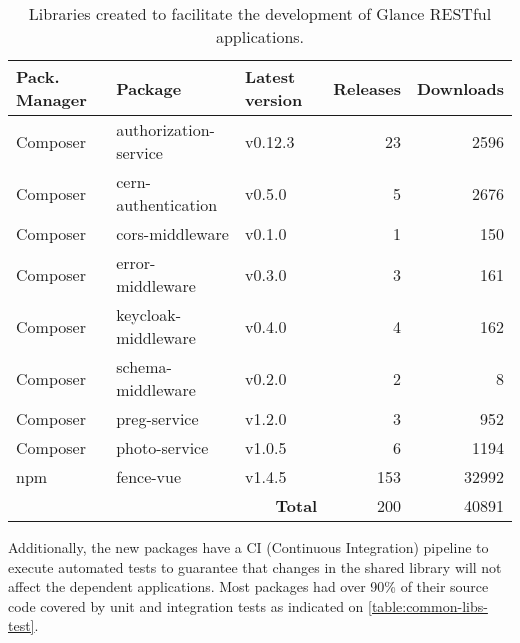 \begin{table}[htbp]
\begin{tabular}{ll|l|r|r|}
\hline
\multicolumn{1}{|l|}{Pack. Manager} & Package & Latest version & \multicolumn{1}{l|}{Releases} & \multicolumn{1}{l|}{Downloads} \\ \hline
\multicolumn{1}{|l|}{Composer} & authorization-service & v0.12.3 & 23  & 2596  \\ 
\multicolumn{1}{|l|}{Composer} & cern-authentication   & v0.5.0  & 5   & 2676  \\ 
\multicolumn{1}{|l|}{Composer} & cors-middleware       & v0.1.0  & 1   & 150   \\ 
\multicolumn{1}{|l|}{Composer} & error-middleware      & v0.3.0  & 3   & 161   \\ 
\multicolumn{1}{|l|}{Composer} & keycloak-middleware   & v0.4.0  & 4   & 162   \\ 
\multicolumn{1}{|l|}{Composer} & schema-middleware     & v0.2.0  & 2   & 8     \\ 
\multicolumn{1}{|l|}{Composer} & preg-service          & v1.2.0  & 3   & 952   \\ 
\multicolumn{1}{|l|}{Composer} & photo-service         & v1.0.5  & 6   & 1194  \\ 
\multicolumn{1}{|l|}{npm}      & fence-vue             & v1.4.5  & 153 & 32992 \\
\hline
         & & \multicolumn{1}{r|}{\textbf{Total}} & 200 & 40891 \\
\cline{3-5} 
\end{tabular}
\caption{Libraries created to facilitate the development of Glance RESTful applications.}
\label{table:common-libs}
\end{table}

Additionally, the new packages have a CI (Continuous Integration) pipeline to execute automated tests to guarantee that changes in the shared library will not affect the dependent applications. Most packages had over 90\% of their source code covered by unit and integration tests as indicated on \autoref{table:common-libs-test}.

